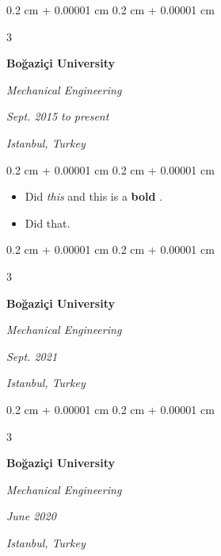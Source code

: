 \documentclass[10pt, letterpaper]{article}
\newenvironment{highlights}{
    \begin{itemize}[
        topsep=0.10 cm,
        parsep=0.10 cm,
        partopsep=0pt,
        itemsep=0pt,
        leftmargin=0.4 cm + 10pt + 0.6 cm
    ]
}{
    \end{itemize}
} %
\newenvironment{onecolentry}{
    \begin{adjustwidth}{
        0.2 cm + 0.00001 cm
    }{
        0.2 cm + 0.00001 cm
    }
}{
    \end{adjustwidth}
} %
\newenvironment{threecolentry}[3][]{
    \onecolentry
    \def\thirdColumn{#3}
    \setcolumnwidth{0.6 cm, \fill, 4.1 cm}
    \begin{paracol}{3}
    #2 \switchcolumn
}{
    \switchcolumn \raggedleft \thirdColumn
    \end{paracol}
    \endonecolentry
} %
\let\hrefWithoutArrow\href
\renewcommand{\href}[2]{\hrefWithoutArrow{#1}{\mbox{\ifthenelse{\equal{#2}{}}{ }{#2 }\raisebox{.15ex}{\footnotesize \faExternalLink*}}}}
\begin{document}
        \vspace{0.2 cm}

        \begin{threecolentry}{
            \vspace*{\fill}
            \textbullet
            \vspace*{3px}
            \vspace*{\fill}
        }{
        \textit{Sept. 2015 to present}
            
        \textit{Istanbul, Turkey}}
            \textbf{Boğaziçi University}

            \textit{Mechanical Engineering}
        \end{threecolentry}

        \vspace{0.10 cm}
        \begin{onecolentry}
            \begin{highlights}
                \item Did \textit{this} and this is a \textbf{bold} \href{https://example.com}{link}.
                \item Did that.
            \end{highlights}
        \end{onecolentry}


        \vspace{0.2 cm}

        \begin{threecolentry}{
            \vspace*{\fill}
            \textbullet
            \vspace*{3px}
            \vspace*{\fill}
        }{
        \textit{Sept. 2021}
            
        \textit{Istanbul, Turkey}}
            \textbf{Boğaziçi University}

            \textit{Mechanical Engineering}
        \end{threecolentry}



        \vspace{0.2 cm}

        \begin{threecolentry}{
            \vspace*{\fill}
            \textbullet
            \vspace*{3px}
            \vspace*{\fill}
        }{
        \textit{June 2020}
            
        \textit{Istanbul, Turkey}}
            \textbf{Boğaziçi University}

            \textit{Mechanical Engineering}
        \end{threecolentry}
\end{document}
